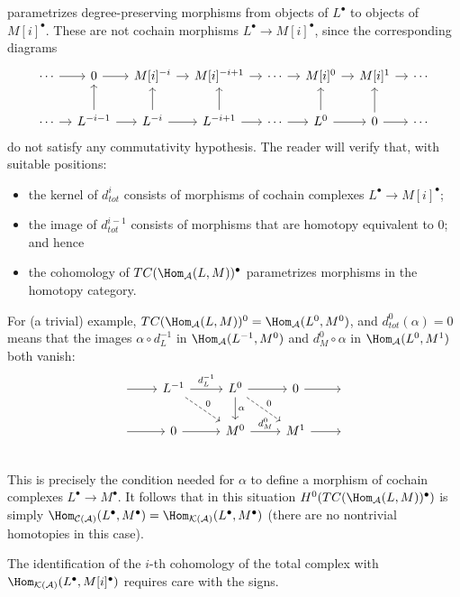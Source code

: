 \begin{example}
parametrizes degree-preserving morphisms from objects of $L^\bullet$ to objects of $M[i]^\bullet$. These are not cochain morphisms $L^\bullet\to M[i]^\bullet$, since the corresponding diagrams
\[\begin{tikzcd}[column sep=1.0 em]
\cdots\ar[r]&0\ar[r]&M[i]^{-i}\ar[r]&M[i]^{-i+1}\ar[r]&\cdots\ar[r]&M[i]^{0}\ar[r]&M[i]^{1}\ar[r]&\cdots\\
\cdots\ar[r]&L^{-i-1}\ar[u]\ar[r]&L^{-i}\ar[u]\ar[r]&L^{-i+1}\ar[u]\ar[r]&\cdots\ar[r]&L^0\ar[r]\ar[u]&0\ar[r]\ar[u]&\cdots
\end{tikzcd}\]
do not satisfy any commutativity hypothesis. The reader will verify that, with suitable positions:
\begin{itemize}
\item the kernel of $d^i_{tot}$ consists of morphisms of cochain complexes $L^\bullet\to M[i]^\bullet$;
\item the image of $d^{i-1}_{tot}$ consists of morphisms that are homotopy equivalent to $0$; and hence
\item the cohomology of $TC(\Hom_{\mathcal{A}}(L,M))^\bullet$ parametrizes morphisms in the homotopy category.
\end{itemize}
For (a trivial) example, $TC(\Hom_{\mathcal{A}}(L,M))^0=\Hom_{\mathcal{A}}(L^0,M^0)$, and $d^0_{tot}(\alpha)=0$ means that the images $\alpha\circ d_L^{-1}$ in $\Hom_{\mathcal{A}}(L^{-1},M^0)$ and $d^0_M\circ\alpha$ in $\Hom_{\mathcal{A}}(L^{0},M^1)$ both vanish:
\[\begin{tikzcd}
{}\ar[r]&L^{-1}\ar[rd,dashed,"0"]\ar[r,"d_L^{-1}"]&L^0\ar[r]\ar[rd,dashed,"0"]\ar[d,"\alpha"]&0\ar[r]&{}\\
{}\ar[r]&0\ar[r]&M^0\ar[r,"d_M^{0}"]&M^1\ar[r]&{}\\
\end{tikzcd}\]
This is precisely the condition needed for $\alpha$ to define a morphism of cochain complexes $L^\bullet\to M^\bullet$. It follows that in this situation $H^0(TC(\Hom_{\mathcal{A}}(L,M))^\bullet)$ is simply $\Hom_{\mathcal{C}(\mathcal{A})}(L^\bullet,M^\bullet)=\Hom_{\mathcal{K}(\mathcal{A})}(L^\bullet,M^\bullet)$ (there are no nontrivial homotopies in this case).\par
The identification of the $i$-th cohomology of the total complex with $\Hom_{\mathcal{K}(\mathcal{A})}(L^\bullet,M[i]^\bullet)$ requires care with the signs.
\end{example}
